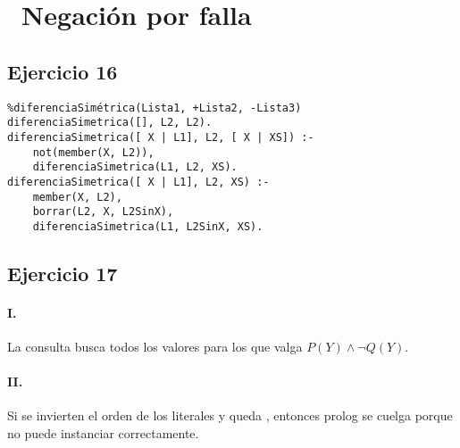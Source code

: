 \documentclass[10pt,a4paper]{article}
\begin{document}
\section*{\ Negación por falla}

\subsection{Ejercicio 16}
\begin{centrado}
\begin{verbatim}
%diferenciaSimétrica(Lista1, +Lista2, -Lista3)
diferenciaSimetrica([], L2, L2).
diferenciaSimetrica([ X | L1], L2, [ X | XS]) :-
	not(member(X, L2)),
	diferenciaSimetrica(L1, L2, XS).
diferenciaSimetrica([ X | L1], L2, XS) :-
	member(X, L2),
	borrar(L2, X, L2SinX),
	diferenciaSimetrica(L1, L2SinX, XS).
\end{verbatim}
\end{centrado}

\subsection{Ejercicio 17}
\paragraph{I.} La consulta busca todos los valores para los que valga $P(Y)\land \lnot Q(Y)$.
\paragraph{II.} Si se invierten el orden de los literales y queda , entonces prolog se cuelga porque no puede instanciar  correctamente.
\end{document}

